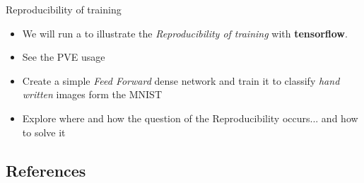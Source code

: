 \documentclass[10pt,serif,mathserif,compress,hyperref={colorlinks}]{beamer}
\begin{document}
\begin{frame}{Reproducibility of training}
  
  \begin{tcolorbox}[title=Practical work with tensorflow]
    
    \begin{itemize}
    \item<1-> We will run a  to illustrate the {\it Reproducibility of training} with {\bf tensorflow}.
    \item<2-> See the PVE usage
    \item<3-> Create a simple {\it Feed Forward} dense network and train it to classify {\it hand written} images form the MNIST
    \item<4-> Explore where and how the question of the Reproducibility occurs... and how to solve it 
    \end{itemize}
  \end{tcolorbox}

    
\end{frame}
 
\subsection{References}
\end{document}

